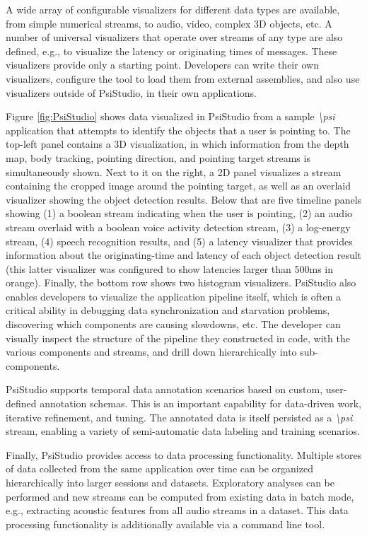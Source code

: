 \documentclass[letterpaper]{article}
\newcommand{\psif}{\emph{\textbackslash psi} }
\begin{document}
A wide array of configurable visualizers for different data types are available, from simple numerical streams, to audio, video, complex 3D objects, etc. A number of universal visualizers that operate over streams of any type are also defined, e.g., to visualize the latency or originating times of messages. These visualizers provide only a starting point. Developers can write their own visualizers, configure the tool to load them from external assemblies, and also use visualizers outside of PsiStudio, in their own applications.

Figure \ref{fig:PsiStudio} shows data visualized in PsiStudio from a sample \psif application that attempts to identify the objects that a user is pointing to. The top-left panel contains a 3D visualization, in which information from the depth map, body tracking, pointing direction, and pointing target streams is simultaneously shown. Next to it on the right, a 2D panel visualizes a stream containing the cropped image around the pointing target, as well as an overlaid visualizer showing the object detection results. Below that are five timeline panels showing (1) a boolean stream indicating when the user is pointing, (2) an audio stream overlaid with a boolean voice activity detection stream, (3) a log-energy stream, (4) speech recognition results, and (5) a latency visualizer that provides information about the originating-time and latency of each object detection result (this latter visualizer was configured to show latencies larger than 500ms in orange). Finally, the bottom row shows two histogram visualizers. PsiStudio also enables developers to visualize the application pipeline itself, which is often a critical ability in debugging data synchronization and starvation problems, discovering which components are causing slowdowns, etc. The developer can visually inspect the structure of the pipeline they constructed in code, with the various components and streams, and drill down hierarchically into sub-components.

PsiStudio supports temporal data annotation scenarios based on custom, user-defined annotation schemas. This is an important capability for data-driven work, iterative refinement, and tuning. The annotated data is itself persisted as a \psif stream, enabling a variety of semi-automatic data labeling and training scenarios.

Finally, PsiStudio provides access to data processing functionality. Multiple stores of data collected from the same application over time can be organized hierarchically into larger sessions and datasets. Exploratory analyses can be performed and new streams can be computed from existing data in batch mode, e.g., extracting acoustic features from all audio streams in a dataset. This data processing functionality is additionally available via a command line tool.
\end{document}
